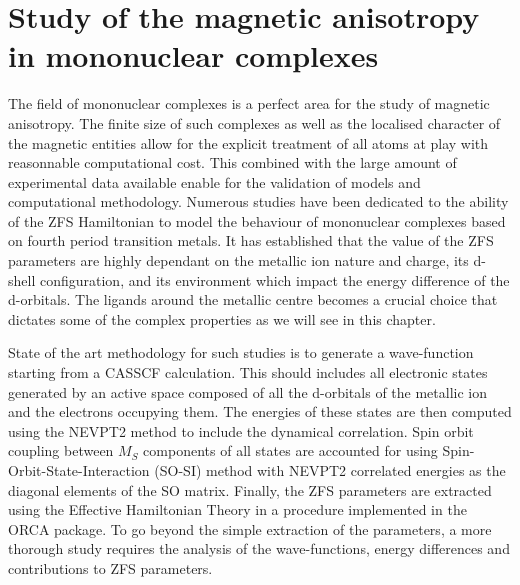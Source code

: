 \documentclass[12pt,a4paper]{report}
\numberwithin{equation}{section}
\begin{document}
\chapter{Study of the magnetic anisotropy in mononuclear complexes}
\label{MonoNucl}

The field of mononuclear complexes is a perfect area for the study of magnetic anisotropy. 
The finite size of such complexes as well as the localised character of the magnetic entities allow for the explicit treatment of all atoms at play with reasonnable computational cost.
This combined with the large amount of experimental data available enable for the validation of models and computational methodology.
Numerous studies have been dedicated to the ability of the ZFS Hamiltonian to model the behaviour of mononuclear complexes based on fourth period transition metals.
It has established that the value of the ZFS parameters are highly dependant on the metallic ion nature and charge, its d-shell configuration, and its environment which impact the energy difference of the d-orbitals.
The ligands around the metallic centre becomes a crucial choice that dictates some of the complex properties as we will see in this chapter.
\par State of the art methodology for such studies is to generate a wave-function starting from a CASSCF calculation. This should includes all electronic states generated by an active space composed of all the d-orbitals of the metallic ion and the electrons occupying them. 
The energies of these states are then computed using the NEVPT2 method to include the dynamical correlation.
Spin orbit coupling between $M_S$ components of all states are accounted for using Spin-Orbit-State-Interaction (SO-SI) method with NEVPT2 correlated energies as the diagonal elements of the SO matrix.
Finally, the ZFS parameters are extracted using the Effective Hamiltonian Theory in a procedure implemented in the ORCA package.
To go beyond the simple extraction of the parameters, a more thorough study requires the analysis of the wave-functions, energy differences and contributions to ZFS parameters.
\end{document}
